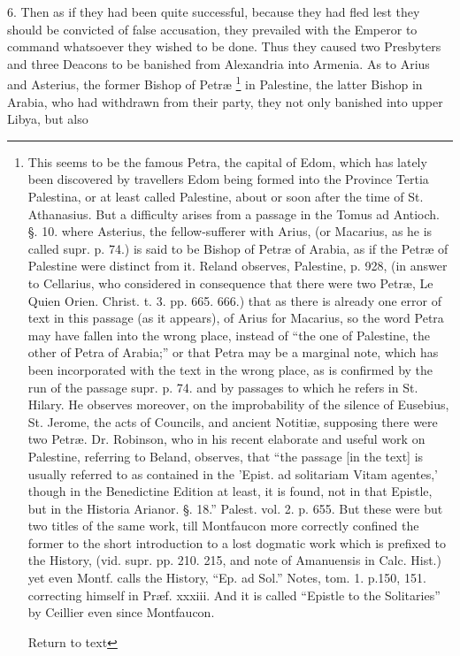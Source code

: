 6. Then as if they had been quite successful,
because they had fled lest they should be convicted of false
accusation, they prevailed with the Emperor to command whatsoever they
wished to be done. Thus they caused two Presbyters and three Deacons
to be banished from Alexandria into Armenia. As to Arius and Asterius,
the former Bishop of Petræ \footnote{This seems to be the famous Petra, the capital of Edom, which has
lately been discovered by travellers Edom being formed into the
Province Tertia Palestina, or at least called Palestine, about or soon
after the time of St. Athanasius. But a difficulty arises from a
passage in the Tomus ad Antioch. §. 10. where Asterius, the
fellow-sufferer with Arius, (or Macarius, as he is called supr. p.
74.) is said to be Bishop of Petræ of Arabia, as if the Petræ of
Palestine were distinct from it. Reland observes, Palestine, p. 928,
(in answer to Cellarius, who considered in consequence that there were
two Petræ, Le Quien Orien. Christ. t. 3. pp. 665. 666.) that as there
is already one error of text in this passage (as it appears), of Arius
for Macarius, so the word Petra may have fallen into the wrong place,
instead of ``the one of Palestine, the other of Petra of Arabia;'' or
that Petra may be a marginal note, which has been incorporated with
the text in the wrong place, as is confirmed by the run of the passage
supr. p. 74. and by passages to which he refers in St. Hilary. He
observes moreover, on the improbability of the silence of Eusebius,
St. Jerome, the acts of Councils, and ancient Notitiæ, supposing
there were two Petræ. Dr. Robinson, who in his recent elaborate and
useful work on Palestine, referring to Beland, observes, that ``the
passage [in the text] is usually referred to as contained in the 'Epist.
ad solitariam Vitam agentes,' though in the Benedictine Edition at
least, it is found, not in that Epistle, but in the Historia Arianor.
§. 18.'' Palest. vol. 2. p. 655. But these were but two titles of the
same work, till Montfaucon more correctly confined the former to the
short introduction to a lost dogmatic work which is prefixed to the
History, (vid. supr. pp. 210. 215, and note of Amanuensis in Calc.
Hist.) yet even Montf. calls the History, ``Ep. ad Sol.'' Notes, tom. 1.
p.150, 151. correcting himself in Præf. xxxiii. And it is called ``Epistle
to the Solitaries'' by Ceillier even since Montfaucon.

Return to text

}
in Palestine, the latter Bishop in Arabia, who had withdrawn
from their party, they not only banished into upper Libya, but also
